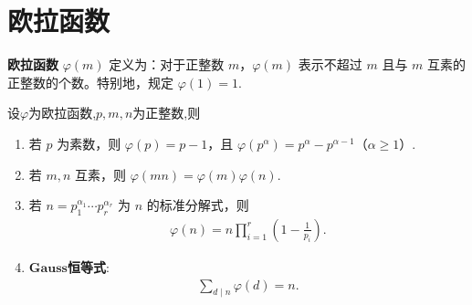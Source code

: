 \documentclass[../../main.tex]{subfiles}%
\begin{document}
\section{欧拉函数}

\begin{definition}[欧拉函数]
\textbf{欧拉函数} $\varphi(m)$ 定义为：对于正整数 $m$，$\varphi(m)$ 表示不超过 $m$ 且与 $m$ 互素的正整数的个数。特别地，规定 $\varphi(1)=1$.
\end{definition}

\begin{theorem}\label{theorem:欧拉函数的基本性质}
设$\varphi$为欧拉函数,$p,m,n$为正整数,则
\begin{enumerate}[(1)]
\item 若 $p$ 为素数，则 $\varphi(p)=p-1$，且 $\varphi(p^\alpha)=p^\alpha-p^{\alpha-1}$（$\alpha\geqslant 1$）.

\item 若 $m,n$ 互素，则 $\varphi(mn)=\varphi(m)\varphi(n)$.

\item 若 $n=p_1^{\alpha_1}\cdots p_r^{\alpha_r}$ 为 $n$ 的标准分解式，则
\begin{align*}
\varphi(n)=n\prod_{i=1}^r\left(1-\frac1{p_i}\right).
\end{align*}

\item\label{theorem:欧拉函数的基本性质-4} $\mathbf{Gauss}$\textbf{恒等式}:
\begin{align}\label{eq:euler_sum}
\sum_{d\mid n}\varphi(d)=n.
\end{align}
\end{enumerate}
\end{theorem}
\end{document}
